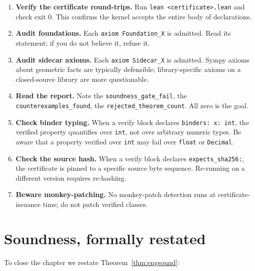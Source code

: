 \begin{enumerate}[leftmargin=1.7em]
  \item \textbf{Verify the certificate round-trips.}  Run
    \texttt{lean <certificate>.lean} and check exit 0.  This
    confirms the \Lean{} kernel accepts the entire body of
    declarations.

  \item \textbf{Audit foundations.}  Each \texttt{axiom Foundation\_X}
    is admitted.  Read its statement; if you do not believe it,
    refuse it.

  \item \textbf{Audit sidecar axioms.}  Each \texttt{axiom
    Sidecar\_X} is admitted.  Sympy axioms about geometric
    facts are typically defensible; library-specific axioms
    on a closed-source library are more questionable.

  \item \textbf{Read the report.}  Note the
    \texttt{soundness\_gate\_fail}, the
    \texttt{counterexamples\_found}, the
    \texttt{rejected\_theorem\_count}.  All zero is the goal.

  \item \textbf{Check binder typing.}  When a verify block declares
    \texttt{binders: x: int}, the verified property quantifies over
    \texttt{int}, not over arbitrary numeric types.  Be aware that
    a property verified over \texttt{int} may fail over
    \texttt{float} or \texttt{Decimal}.

  \item \textbf{Check the source hash.}  When a verify block
    declares \texttt{expects\_sha256:}, the certificate is pinned
    to a specific source byte sequence.  Re-running on a different
    \Sympy{} version requires re-hashing.

  \item \textbf{Beware monkey-patching.}  No monkey-patch detection
    runs at certificate-issuance time; do not patch verified
    classes.
\end{enumerate}

\section{Soundness, formally restated}

To close the chapter we restate Theorem~\ref{thm:engsound}:


